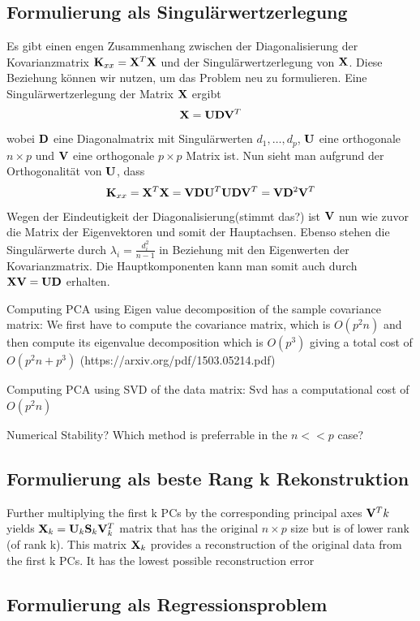 \subsection{Formulierung als Singulärwertzerlegung}
Es gibt einen engen Zusammenhang zwischen der Diagonalisierung der Kovarianzmatrix $\mathbf{K}_{xx} = \mathbf{X}^T \mathbf{X}$ und der Singulärwertzerlegung von $\mathbf{X}$. Diese Beziehung können wir nutzen, um das Problem neu zu formulieren. Eine Singulärwertzerlegung der Matrix $\mathbf{X}$ ergibt
$$ \mathbf{X} = \mathbf{U}\mathbf{D}\mathbf{V}^T $$
wobei $\mathbf{D}$ eine Diagonalmatrix mit Singulärwerten $d_1,\ldots,d_p$, $\mathbf{U}$ eine orthogonale $n \times p$ und $\mathbf{V}$ eine orthogonale $p \times p$ Matrix ist. Nun sieht man aufgrund der Orthogonalität von $\mathbf{U}$, dass
$$\mathbf{K}_{xx} = \mathbf{X}^T \mathbf{X} = \mathbf{V}\mathbf{D}\mathbf{U}^T \mathbf{U}\mathbf{D}\mathbf{V}^T = \mathbf{V} \mathbf{D}^2 \mathbf{V}^T$$
Wegen der Eindeutigkeit der Diagonalisierung(stimmt das?) ist $\mathbf{V}$ nun wie zuvor die Matrix der Eigenvektoren und somit der Hauptachsen. Ebenso stehen die Singulärwerte durch $\lambda_i = \frac{d_i^2}{n-1}$ in Beziehung mit den Eigenwerten der Kovarianzmatrix. Die Hauptkomponenten kann man somit auch durch $\mathbf{X} \mathbf{V} = \mathbf{U} \mathbf{D}$ erhalten.

Computing PCA using Eigen value decomposition of the sample covariance matrix:
We first have to compute the covariance matrix, which is $O(p^2n)$ and then compute its eigenvalue decomposition which is $O(p^3)$ giving a total cost of $O(p^2n+p^3)$ (https://arxiv.org/pdf/1503.05214.pdf)

Computing PCA using SVD of the data matrix:
Svd has a computational cost of $O(p^2n)$

Numerical Stability? Which method is preferrable in the $n << p$ case?


\subsection{Formulierung als beste Rang k Rekonstruktion}
Further multiplying the first k PCs by the corresponding principal axes $\mathbf{V}^T k$ yields $\mathbf{X}_k = \mathbf{U}_k \mathbf{S}_k \mathbf{V}_k^T$ matrix that has the original $n \times p$ size but is of lower rank (of rank k). This matrix $\mathbf{X}_k$ provides a reconstruction of the original data from the first k PCs. It has the lowest possible reconstruction error


\subsection{Formulierung als Regressionsproblem}

